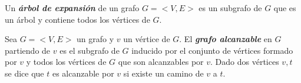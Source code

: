 \begin{definition}
    Un \textbf{\textit{\'arbol de expansión}} de un grafo $G=<V,E>$ es un subgrafo de $G$ que es un \'arbol 
    y contiene todos los v\'ertices de $G$.
\end{definition}


\begin{definition}
    Sea $G=<V,E>$ un grafo y $v$ un v\'ertice de $G$. El \textbf{\textit{grafo alcanzable}} en $G$ partiendo de $v$ 
    es el subgrafo de $G$ inducido por el conjunto de v\'ertices formado por $v$ y todos los v\'ertices de $G$ que 
    son alcanzables por $v$. Dado dos v\'ertices $v,t$ se dice que $t$ es alcanzable por $v$ si existe un 
    camino de $v$ a $t$.  
\end{definition}